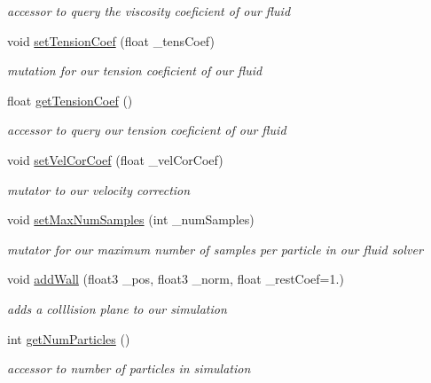 \begin{DoxyCompactItemize}
\begin{DoxyCompactList}\small\item\em accessor to query the viscosity coeficient of our fluid \end{DoxyCompactList}\item 
\hypertarget{class_s_p_h_engine_ac1e6f83f2da1ec79a6e6a633b810daba}{void \hyperlink{class_s_p_h_engine_ac1e6f83f2da1ec79a6e6a633b810daba}{set\-Tension\-Coef} (float \-\_\-tens\-Coef)}\label{class_s_p_h_engine_ac1e6f83f2da1ec79a6e6a633b810daba}

\begin{DoxyCompactList}\small\item\em mutation for our tension coeficient of our fluid \end{DoxyCompactList}\item 
\hypertarget{class_s_p_h_engine_afa874402b050ea1f618bf2caf7f988b4}{float \hyperlink{class_s_p_h_engine_afa874402b050ea1f618bf2caf7f988b4}{get\-Tension\-Coef} ()}\label{class_s_p_h_engine_afa874402b050ea1f618bf2caf7f988b4}

\begin{DoxyCompactList}\small\item\em accessor to query our tension coeficient of our fluid \end{DoxyCompactList}\item 
\hypertarget{class_s_p_h_engine_a6b418198ceab591b1abfa5f645dbc9d7}{void \hyperlink{class_s_p_h_engine_a6b418198ceab591b1abfa5f645dbc9d7}{set\-Vel\-Cor\-Coef} (float \-\_\-vel\-Cor\-Coef)}\label{class_s_p_h_engine_a6b418198ceab591b1abfa5f645dbc9d7}

\begin{DoxyCompactList}\small\item\em mutator to our velocity correction \end{DoxyCompactList}\item 
void \hyperlink{class_s_p_h_engine_aad9d9bc9a1a7e5f64a5e045c339f8b3e}{set\-Max\-Num\-Samples} (int \-\_\-num\-Samples)
\begin{DoxyCompactList}\small\item\em mutator for our maximum number of samples per particle in our fluid solver \end{DoxyCompactList}\item 
void \hyperlink{class_s_p_h_engine_aa53becc41023eb45601eb3060860193a}{add\-Wall} (float3 \-\_\-pos, float3 \-\_\-norm, float \-\_\-rest\-Coef=1.)
\begin{DoxyCompactList}\small\item\em adds a colllision plane to our simulation \end{DoxyCompactList}\item 
\hypertarget{class_s_p_h_engine_a387ab48532ca20b2eb31319e862e243b}{int \hyperlink{class_s_p_h_engine_a387ab48532ca20b2eb31319e862e243b}{get\-Num\-Particles} ()}\label{class_s_p_h_engine_a387ab48532ca20b2eb31319e862e243b}

\begin{DoxyCompactList}\small\item\em accessor to number of particles in simulation \end{DoxyCompactList}\end{DoxyCompactItemize}


